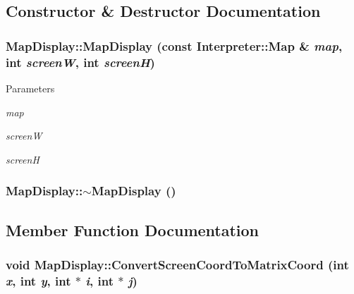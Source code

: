 \subsection{Constructor \& Destructor Documentation}
\hypertarget{classMapDisplay_a3af0dfed1bf4e41a1fe810271593729d}{
\subsubsection[{MapDisplay}]{\setlength{\rightskip}{0pt plus 5cm}MapDisplay::MapDisplay (const {\bf Interpreter::Map} \& {\em map}, \/  int {\em screenW}, \/  int {\em screenH})}}
\label{classMapDisplay_a3af0dfed1bf4e41a1fe810271593729d}

\begin{DoxyParams}{Parameters}
\item[{\em map}]\item[{\em screenW}]\item[{\em screenH}]\end{DoxyParams}
\hypertarget{classMapDisplay_a95dc44c5a18970df2131eeb10b59cd21}{
\subsubsection[{$\sim$MapDisplay}]{\setlength{\rightskip}{0pt plus 5cm}MapDisplay::$\sim$MapDisplay ()}}
\label{classMapDisplay_a95dc44c5a18970df2131eeb10b59cd21}


\subsection{Member Function Documentation}
\hypertarget{classMapDisplay_afd0ef9d9c11103bd966d27a12cd84ed7}{
\subsubsection[{ConvertScreenCoordToMatrixCoord}]{\setlength{\rightskip}{0pt plus 5cm}void MapDisplay::ConvertScreenCoordToMatrixCoord (int {\em x}, \/  int {\em y}, \/  int $\ast$ {\em i}, \/  int $\ast$ {\em j})}}
\label{classMapDisplay_afd0ef9d9c11103bd966d27a12cd84ed7}

